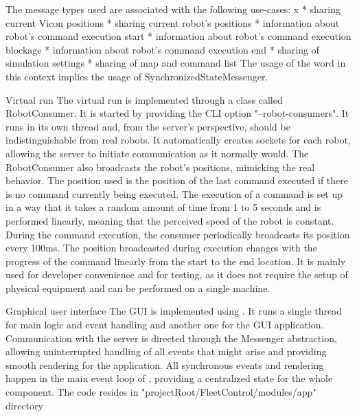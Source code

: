 The message types used are associated with the following use-cases:
\begitems \style x
    * sharing current Vicon positions
    * sharing current robot's positions
    * information about robot's command execution start
    * information about robot's command execution blockage
    * information about robot's command execution end
    * sharing of simulation settings
    * sharing of map and command list
\enditems
The usage of the word {} in this context implies the usage of SynchronizedStateMessenger.

\secc Virtual run
The virtual run is implemented through a class called RobotConsumer. It is started by providing the CLI option "--robot-consumers". It runs in its own thread and, from the server's perspective, should be indistinguishable from real robots. It automatically creates sockets for each robot, allowing the server to initiate communication as it normally would. The RobotConsumer also broadcasts the robot's positions, mimicking the real behavior. The position used is the position of the last command executed if there is no command currently being executed. The execution of a command is set up in a way that it takes a random amount of time from 1 to 5 seconds and is performed linearly, meaning that the perceived speed of the robot is constant. During the command execution, the consumer periodically broadcasts its position every 100ms. The position broadcasted during execution changes with the progress of the command linearly from the start to the end location.
It is mainly used for developer convenience and for testing, as it does not require the setup of physical equipment and can be performed on a single machine.

\sec Graphical user interface
The GUI is implemented using {\of}. It runs a single thread for main logic and event handling and another one for the GUI application. Communication with the server is directed through the Messenger abstraction, allowing uninterrupted handling of all events that might arise and providing smooth rendering for the application. All synchronous events and rendering happen in the main event loop of {\of}, providing a centralized state for the whole component.
The code resides in "{projectRoot}/FleetControl/modules/app" directory
\fleetControlGui

